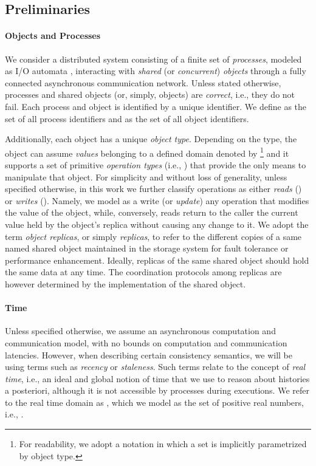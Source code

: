 \documentclass[letter, 11pt]{article}
\renewcommand{\cite}{\citep}
\begin{document}
\subsection{Preliminaries}

\paragraph{Objects and Processes}
We consider a distributed system consisting of a finite set of \emph{processes}, 
modeled as I/O automata \cite{Lynch.Tuttle:89}, 
interacting with \emph{shared} (or \emph{concurrent}) \emph{objects}  through a 
fully connected asynchronous communication network.  
Unless stated otherwise, processes and shared objects (or, simply, objects) are \emph{correct}, i.e., they do not fail. Each process and object is identified by a unique identifier.
We define  as the set of all process identifiers and  as the set of all object identifiers. 

Additionally, each object has a unique \emph{object type}.
Depending on the type, the object can assume \emph{values} belonging to a defined domain denoted by \footnote{For readability, we adopt a notation in which a set  is implicitly parametrized by object type.} 
and it supports a set of primitive \emph{operation types} (i.e., )
that provide the only means to manipulate that object.
For simplicity and without loss of generality, unless specified otherwise, 
in this work we further classify operations as either 
\emph{reads} () or \emph{writes} (). 
Namely, we model as a write (or \emph{update}) any operation that modifies the value of the object, while, conversely, 
reads return to the caller the current value held by the object's replica without
causing any change to it.
We adopt the term \emph{object replicas}, or simply \emph{replicas}, to refer to the different copies of a
same named shared object maintained in the storage system for  
fault tolerance or performance enhancement.
Ideally, replicas of the same shared object should hold the same data at any time.
The coordination protocols among replicas are however determined by the implementation of the shared object.

\paragraph{Time} Unless specified otherwise, we assume an asynchronous computation and communication model, 
with no bounds on computation and communication latencies.
However, when describing certain consistency semantics, we will be using terms such as \emph{recency} or \emph{staleness}. 
Such terms relate to the concept of \emph{real time}, i.e., an ideal and global notion of time that we use to reason about histories a posteriori, 
although it is not accessible by processes during executions. 
We refer to the real time domain as , which we model as the set of positive real numbers, i.e., .
\end{document}
